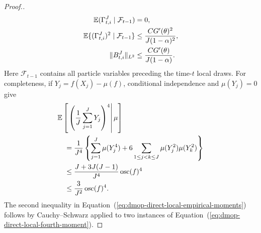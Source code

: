 \documentclass[11pt]{article}
\theoremstyle{thmstylethree}%
\begin{document}
\begin{proof}[Proof.]
\begin{align}
\mathbb{E}(\Gamma_{t,i}^J\mid\mathcal F_{t-1})&=0,                 \notag\\
\mathbb{E}\{(\Gamma_{t,i}^J)^2\mid\mathcal F_{t-1}\}
&\leq
\frac{CG'(\theta)^2}{J(1-\alpha)^2},                       \notag\\
\|B_{t,i}^J\|_{L^2}
&\leq
\frac{CG'(\theta)}{J(1-\alpha)}.
\label{eq:dmop-direct-local-field-bounds}
\end{align}
Here $\mathcal F_{t-1}$ contains all particle variables preceding the
time-$t$ local draws.  For completeness, if
$Y_j=f(X_j)-\mu(f)$, conditional independence and $\mu(Y_j)=0$ give
\begin{align}
&\mathbb{E}\left[
\left.
\left(\frac1J\sum_{j=1}^JY_j\right)^4
\right|\mu
\right]                                                     \notag\\
&\quad=
\frac1{J^4}
\left\{
\sum_{j=1}^J\mu(Y_j^4)
+6\sum_{1\leq j<k\leq J}\mu(Y_j^2)\mu(Y_k^2)
\right\}                                                    \notag\\
&\quad\leq
\frac{J+3J(J-1)}{J^4}\operatorname{osc}(f)^4              \notag\\
&\quad\leq
\frac{3}{J^2}\operatorname{osc}(f)^4.
\label{eq:dmop-direct-local-fourth-moment}
\end{align}
The second inequality in
Equation~(\ref{eq:dmop-direct-local-empirical-moments}) follows by
Cauchy--Schwarz applied to two instances of
Equation~(\ref{eq:dmop-direct-local-fourth-moment}).


\end{proof}
\end{document}
